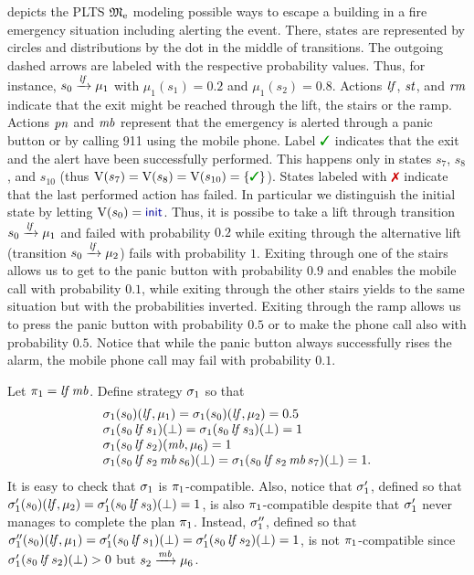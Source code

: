 \begin{example}[Running]\label{ex:running}
   depicts the PLTS ${\mathfrak{M}}_{\mathrm{e}}$ modeling
  possible ways to escape a building in a fire emergency situation
  including alerting the event.  There, states are represented by
  circles and distributions by the dot in the middle of transitions.
  The outgoing dashed arrows are labeled with the respective
  probability values.  Thus, for instance, $s_0\xrightarrow{\mathit{lf}}\mu_1$
  with $\mu_1(s_1)=0.2$ and $\mu_1(s_2)=0.8$.
  Actions $\mathit{lf}$, $\mathit{st}$, and $\mathit{rm}$ indicate that the exit might
  be reached through the lift, the stairs or the ramp.  Actions
  $\mathit{pn}$ and $\mathit{mb}$ represent that the emergency is alerted
  through a panic button or by calling 911 using the mobile phone.
  Label $\goal$ indicates that the exit and the alert have been
  successfully performed.  This happens only in states $s_7$, $s_8$,
  and $s_{10}$ (thus $\V(s_7)=\V(s_8)=\V(s_{10})=\{\goal\}$).  States
  labeled with $\fail$ indicate that the last performed action has
  failed.  In particular we distinguish the initial state by letting
  $\V(s_0)=\init$.
  Thus, it is possibe to take a lift through transition
  $s_0\xrightarrow{\mathit{lf}}\mu_1$ and failed with probability $0.2$ while
  exiting through the alternative lift (transition
  $s_0\xrightarrow{\mathit{lf}}\mu_2$) fails with probability $1$.
  Exiting through one of the stairs allows us to get to the panic
  button with probability $0.9$ and enables the mobile call with
  probability $0.1$, while exiting through the other stairs yields to
  the same situation but with the probabilities inverted.  Exiting
  through the ramp allows us to press the panic button with
  probability $0.5$ or to make the phone call also with probability
  $0.5$.
  Notice that while the panic button always successfully rises the
  alarm, the mobile phone call may fail with probability $0.1$.

  Let $\pi_1 = \mathit{lf}\,\mathit{mb}$.  Define strategy $\sigma_1$ so that
  \[
  \begin{array}{l}
    \sigma_1(s_0)(\mathit{lf},\mu_1)=\sigma_1(s_0)(\mathit{lf},\mu_2)=0.5\\
    \sigma_1(s_0\,\mathit{lf}\,s_1)(\bot)=\sigma_1(s_0\,\mathit{lf}\,s_3)(\bot)=1\\
    \sigma_1(s_0\,\mathit{lf}\,s_2)(\mathit{mb},\mu_6)=1\\
    \sigma_1(s_0\,\mathit{lf}\,s_2\,\mathit{mb}\,s_6)(\bot)=
    \sigma_1(s_0\,\mathit{lf}\,s_2\,\mathit{mb}\,s_7)(\bot)=1.
  \end{array}
  \]
  It is easy to check that $\sigma_1$ is $\pi_1$-compatible.
  Also, notice that $\sigma'_1$, defined so that
  $\sigma'_1(s_0)(\mathit{lf},\mu_2)=\sigma'_1(s_0\,\mathit{lf}\,s_3)(\bot)=1$,
  is also $\pi_1$-compatible despite that $\sigma'_1$ never manages to
  complete the plan $\pi_1$.
  Instead, $\sigma''_1$, defined so that
  $\sigma''_1(s_0)(\mathit{lf},\mu_1)=\sigma'_1(s_0\,\mathit{lf}\,s_1)(\bot)=\sigma'_1(s_0\,\mathit{lf}\,s_2)(\bot)=1$,
  is not $\pi_1$-compatible since
  $\sigma'_1(s_0\,\mathit{lf}\,s_2)(\bot)>0$ but
  ${s_2\xrightarrow{\mathit{mb}}\mu_6}$.
\end{example}


